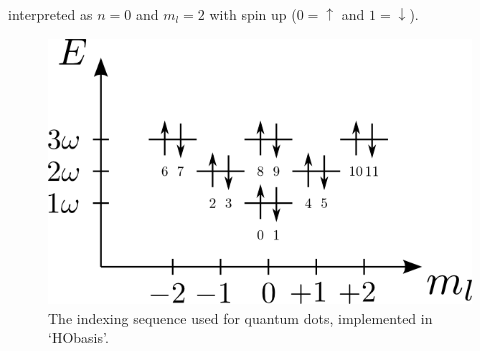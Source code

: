 interpreted as $n=0$ and $m_l = 2$ with spin up ($0=\uparrow$ and $1=\downarrow$).
\begin{figure}
\begin{center}
\includegraphics[scale=1.5]{../07-qDots/figs/spektrum.png}
\caption{The indexing sequence used for quantum dots, implemented in `HObasis'.}
\label{fig:qDots:qDotIndex}
\end{center}
\end{figure}


